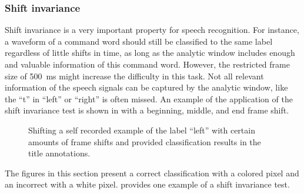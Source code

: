 \subsubsection{Shift invariance}
Shift invariance is a very important property for speech recognition. 
For instance, a waveform of a command word should still be classified to the same label regardless of little shifts in time, as long as the analytic window includes enough and valuable information of this command word.
However, the restricted frame size of \SI{500}{\milli\second} might increase the difficulty in this task.
Not all relevant information of the speech signals can be captured by the analytic window, like the \enquote{t} in \enquote{left} or \enquote{right} is often missed.
An example of the application of the shift invariance test is shown in  with a beginning, middle, and end frame shift.
\begin{figure}[!ht]
  \centering
  \caption{Shifting a self recorded example of the label \enquote{left} with certain amounts of frame shifts and provided classification results in the title annotations.}
  \label{fig:exp_details_tb_shift_left}
\end{figure}
\FloatBarrier
\noindent
The figures in this section present a correct classification with a colored pixel and an incorrect with a white pixel.
 provides one example of a shift invariance test.
